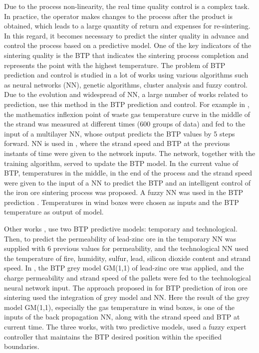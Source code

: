 \documentclass[AMS,STIX2COL]{WileyNJD-v2}
\begin{document}
Due to the process non-linearity, the real time quality control is a complex task. In practice, the operator makes changes to the process after the product is obtained, which leads to a large quantity of return and expenses for re-sintering. In this regard, it becomes necessary to predict the sinter quality in advance and control the process based on a predictive model.
One of the key indicators of the sintering quality is the BTP that indicates the sintering process completion and represents the point with the highest temperature. The problem of BTP prediction and control is studied in a lot of works using various algorithms such as neural networks (NN), genetic algorithms, cluster analysis and fuzzy control. Due to the evolution and widespread of NN, a large number of works related to prediction, use this method in the BTP prediction and control. For example in \cite{Feng2000}, the mathematics inflexion point of waste gas temperature curve in the middle of the strand was measured at different times (600 groups of data) and fed to the input of a multilayer NN, whose output predicts the BTP values by 5 steps forward. NN is used in \cite{LiPeng2006}, where the strand speed and BTP at the previous instants of time were given to the network inputs. The network, together with the training algorithm, served to update the BTP model. In \cite{Du2017} the current value of BTP, temperatures in the middle, in the end of the process and the strand speed were given to the input of a NN to predict the BTP and an intelligent control of the iron ore sintering process was proposed. A fuzzy NN was used in the BTP prediction \cite{Wang20141}. Temperatures in wind boxes were chosen as inputs and the BTP temperature as output of model.


Other works \cite{Wu2006}, \cite{Wu2012} use two BTP predictive models: temporary and technological. Then, to predict the permeability of lead-zinc ore in \cite{Wu2006} the temporary NN was supplied with 6 previous values for permeability, and the technological NN used the temperature of fire, humidity, sulfur, lead, silicon dioxide content and strand speed. In \cite{Wu2012}, the BTP grey model GM(1,1) of lead-zinc ore was applied, and the charge permeability and strand speed of the pallets were fed to the technological neural network input. The approach proposed in \cite{Wu2012b} for BTP prediction of iron ore sintering used the integration of grey model and NN. Here the result of the grey model GM(1,1), especially the gas temperature in wind boxes, is one of the inputs of the back propagation NN, along with the strand speed and BTP at current time. The three works, with two predictive models, used a fuzzy expert controller that maintains the BTP desired position within the specified boundaries.
\end{document}
